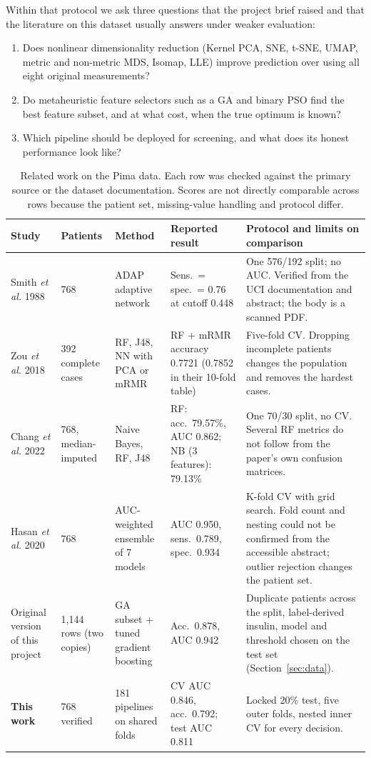 \documentclass[conference]{IEEEtran}
\begin{document}
Within that protocol we ask three questions that the project brief raised and that the literature on this dataset usually answers under weaker evaluation:
\begin{enumerate}
\item Does nonlinear dimensionality reduction (Kernel PCA, SNE, t-SNE, UMAP, metric and non-metric MDS, Isomap, LLE) improve prediction over using all eight original measurements?
\item Do metaheuristic feature selectors such as a GA and binary PSO find the best feature subset, and at what cost, when the true optimum is known?
\item Which pipeline should be deployed for screening, and what does its honest performance look like?
\end{enumerate}

\begin{table}[!t]
\centering
\caption{Related work on the Pima data. Each row was checked against the primary source or the dataset documentation. Scores are not directly comparable across rows because the patient set, missing-value handling and protocol differ.}
\label{tab:related}
\footnotesize
\begin{tabularx}{\textwidth}{@{}p{2.6cm}p{2.1cm}p{3.1cm}p{2.6cm}X@{}}
\toprule
Study & Patients & Method & Reported result & Protocol and limits on comparison \\
\midrule
Smith \textit{et al.} 1988 \cite{smith1988} & 768 & ADAP adaptive network & Sens.\ = spec.\ = 0.76 at cutoff 0.448 & One 576/192 split; no AUC. Verified from the UCI documentation and abstract; the body is a scanned PDF. \\
Zou \textit{et al.} 2018 \cite{zou2018} & 392 complete cases & RF, J48, NN with PCA or mRMR & RF + mRMR accuracy 0.7721 (0.7852 in their 10-fold table) & Five-fold CV. Dropping incomplete patients changes the population and removes the hardest cases. \\
Chang \textit{et al.} 2022 \cite{chang2022} & 768, median-imputed & Naive Bayes, RF, J48 & RF: acc.\ 79.57\%, AUC 0.862; NB (3 features): 79.13\% & One 70/30 split, no CV. Several RF metrics do not follow from the paper's own confusion matrices. \\
Hasan \textit{et al.} 2020 \cite{hasan2020} & 768 & AUC-weighted ensemble of 7 models & AUC 0.950, sens.\ 0.789, spec.\ 0.934 & K-fold CV with grid search. Fold count and nesting could not be confirmed from the accessible abstract; outlier rejection changes the patient set. \\
Original version of this project & 1,144 rows (two copies) & GA subset + tuned gradient boosting & Acc.\ 0.878, AUC 0.942 & Duplicate patients across the split, label-derived insulin, model and threshold chosen on the test set (Section~\ref{sec:data}). \\
\textbf{This work} & 768 verified & 181 pipelines on shared folds & CV AUC 0.846, acc.\ 0.792; test AUC 0.811 & Locked 20\% test, five outer folds, nested inner CV for every decision. \\
\bottomrule
\end{tabularx}
\end{table}
\end{document}
